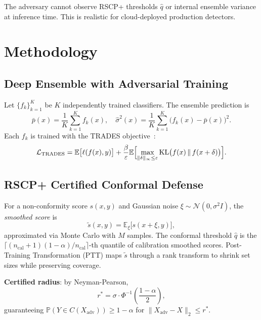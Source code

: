 \documentclass[conference]{IEEEtran}
\begin{document}
The adversary cannot observe RSCP+ thresholds $\hat{q}$ or internal
ensemble variance at inference time. This is realistic for cloud-deployed
production detectors.

\section{Methodology}
\label{sec:method}

\subsection{Deep Ensemble with Adversarial Training}

Let $\{f_k\}_{k=1}^{K}$ be $K$ independently trained classifiers. The ensemble
prediction is
\begin{equation}
  \bar{p}(x) = \frac{1}{K}\sum_{k=1}^K f_k(x), \quad
  \hat{\sigma}^2(x) = \frac{1}{K}\sum_{k=1}^K \bigl(f_k(x) - \bar{p}(x)\bigr)^2.
\end{equation}
Each $f_k$ is trained with the TRADES objective~\cite{zhang2019theoretically}:
\begin{equation}
  \mathcal{L}_{\text{TRADES}} =
    \mathbb{E}\bigl[\ell(f(x), y)\bigr]
    + \frac{\beta}{\varepsilon}
      \mathbb{E}\Bigl[\max_{\|\delta\|_\infty \le \varepsilon}
        \mathrm{KL}\bigl(f(x) \,\|\, f(x+\delta)\bigr)\Bigr].
\end{equation}

\subsection{RSCP+ Certified Conformal Defense}

For a non-conformity score $s(x, y)$ and Gaussian noise $\xi \sim \mathcal{N}(0, \sigma^2 I)$,
the \emph{smoothed score} is
\begin{equation}
  \tilde{s}(x, y) = \mathbb{E}_{\xi}\bigl[s(x + \xi, y)\bigr],
\end{equation}
approximated via Monte Carlo with $M$ samples.
The conformal threshold $\hat{q}$ is the $\lceil(n_{\text{cal}}+1)(1-\alpha)/n_{\text{cal}}\rceil$-th
quantile of calibration smoothed scores.
Post-Training Transformation (PTT) maps $\tilde{s}$ through a rank transform
to shrink set sizes while preserving coverage.

\textbf{Certified radius}: by Neyman-Pearson,
\begin{equation}
  r^* = \sigma \cdot \Phi^{-1}\!\left(\frac{1-\alpha}{2}\right),
\end{equation}
guaranteeing $\mathbb{P}(Y \in C(X_{\mathrm{adv}})) \ge 1-\alpha$ for
$\|X_{\mathrm{adv}} - X\|_2 \le r^*$.
\end{document}
